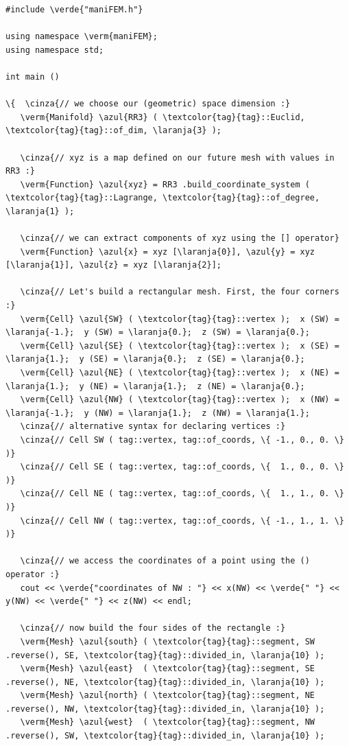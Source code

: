 \begin{Verbatim}[commandchars=\\\{\},formatcom=\small\tt,frame=single,
   label=parag-\ref{\numb section 1.\numb parag 1}.cpp,rulecolor=\color{moldura},
   baselinestretch=0.94,framesep=2mm                                            ]
#include \verde{"maniFEM.h"}

using namespace \verm{maniFEM};
using namespace std;

int main ()

\{  \cinza{// we choose our (geometric) space dimension :}
   \verm{Manifold} \azul{RR3} ( \textcolor{tag}{tag}::Euclid, \textcolor{tag}{tag}::of_dim, \laranja{3} );
   
   \cinza{// xyz is a map defined on our future mesh with values in RR3 :}
   \verm{Function} \azul{xyz} = RR3 .build_coordinate_system ( \textcolor{tag}{tag}::Lagrange, \textcolor{tag}{tag}::of_degree, \laranja{1} );

   \cinza{// we can extract components of xyz using the [] operator}
   \verm{Function} \azul{x} = xyz [\laranja{0}], \azul{y} = xyz [\laranja{1}], \azul{z} = xyz [\laranja{2}];

   \cinza{// Let's build a rectangular mesh. First, the four corners :}
   \verm{Cell} \azul{SW} ( \textcolor{tag}{tag}::vertex );  x (SW) = \laranja{-1.};  y (SW) = \laranja{0.};  z (SW) = \laranja{0.};
   \verm{Cell} \azul{SE} ( \textcolor{tag}{tag}::vertex );  x (SE) =  \laranja{1.};  y (SE) = \laranja{0.};  z (SE) = \laranja{0.};
   \verm{Cell} \azul{NE} ( \textcolor{tag}{tag}::vertex );  x (NE) =  \laranja{1.};  y (NE) = \laranja{1.};  z (NE) = \laranja{0.};
   \verm{Cell} \azul{NW} ( \textcolor{tag}{tag}::vertex );  x (NW) = \laranja{-1.};  y (NW) = \laranja{1.};  z (NW) = \laranja{1.};
   \cinza{// alternative syntax for declaring vertices :}
   \cinza{// Cell SW ( tag::vertex, tag::of_coords, \{ -1., 0., 0. \} )}
   \cinza{// Cell SE ( tag::vertex, tag::of_coords, \{  1., 0., 0. \} )}
   \cinza{// Cell NE ( tag::vertex, tag::of_coords, \{  1., 1., 0. \} )}
   \cinza{// Cell NW ( tag::vertex, tag::of_coords, \{ -1., 1., 1. \} )}
   
   \cinza{// we access the coordinates of a point using the () operator :}
   cout << \verde{"coordinates of NW : "} << x(NW) << \verde{" "} << y(NW) << \verde{" "} << z(NW) << endl;

   \cinza{// now build the four sides of the rectangle :}
   \verm{Mesh} \azul{south} ( \textcolor{tag}{tag}::segment, SW .reverse(), SE, \textcolor{tag}{tag}::divided_in, \laranja{10} );
   \verm{Mesh} \azul{east}  ( \textcolor{tag}{tag}::segment, SE .reverse(), NE, \textcolor{tag}{tag}::divided_in, \laranja{10} );
   \verm{Mesh} \azul{north} ( \textcolor{tag}{tag}::segment, NE .reverse(), NW, \textcolor{tag}{tag}::divided_in, \laranja{10} );
   \verm{Mesh} \azul{west}  ( \textcolor{tag}{tag}::segment, NW .reverse(), SW, \textcolor{tag}{tag}::divided_in, \laranja{10} );
   

\end{Verbatim}
